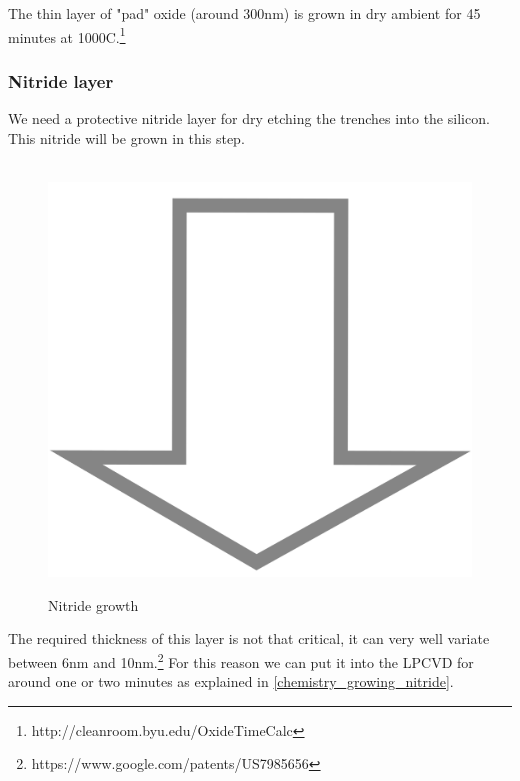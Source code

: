 The thin layer of "pad" oxide (around 300nm) is grown in dry ambient for 45 minutes at 1000\degree C.\footnote{http://cleanroom.byu.edu/OxideTimeCalc}

\subsubsection{Nitride layer}

We need a protective nitride layer for dry etching the trenches into the silicon. This nitride will be grown in this step.

\begin{figure}[H]
	\centering
	\begin{tikzpicture}[node distance = 3cm, auto, thick,scale=\CrossSectionOnly, every node/.style={transform shape}]
		
	\end{tikzpicture} \\
	\includegraphics[scale=0.01]{down_arrow.png} \\
	\begin{tikzpicture}[node distance = 3cm, auto, thick,scale=\CrossSectionOnly, every node/.style={transform shape}]
		
	\end{tikzpicture}
	\caption{Nitride growth}
\end{figure}

The required thickness of this layer is not that critical, it can very well variate between 6nm and 10nm.\footnote{https://www.google.com/patents/US7985656}
For this reason we can put it into the LPCVD for around one or two minutes as explained in \autoref{chemistry_growing_nitride}.

